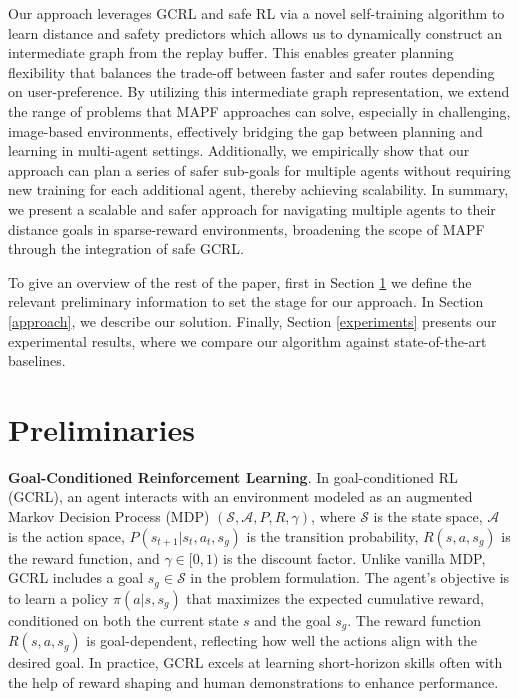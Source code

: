 \documentclass[letterpaper, 10 pt, conference]{IEEEConference}
\begin{document}
Our approach leverages GCRL and safe RL via a novel self-training algorithm to learn distance and safety predictors which allows us to dynamically construct an intermediate graph from the replay buffer. This enables greater planning flexibility that balances the trade-off between faster and safer routes depending on user-preference. By utilizing this intermediate graph representation, we extend the range of problems that MAPF approaches can solve, especially in challenging, image-based environments, effectively bridging the gap between planning and learning in multi-agent settings. Additionally, we empirically show that our approach can plan a series of safer sub-goals for multiple agents without requiring new training for each additional agent, thereby achieving scalability. In summary, we present a scalable and safer approach for navigating multiple agents to their distance goals in sparse-reward environments, broadening the scope of MAPF through the integration of safe GCRL.

To give an overview of the rest of the paper, first in Section \ref{preliminaries} we define the relevant preliminary information to set the stage for our approach. In Section \ref{approach}, we describe our solution.  Finally, Section \ref{experiments} presents our experimental results, where we compare our algorithm against state-of-the-art baselines.  

\section{Preliminaries}
\label{preliminaries}

\textbf{Goal-Conditioned Reinforcement Learning}. In goal-conditioned RL (GCRL), an agent interacts with an environment modeled as an augmented Markov Decision Process (MDP) \((\mathcal{S}, \mathcal{A}, P, R, \gamma)\), where \(\mathcal{S}\) is the state space, \(\mathcal{A}\) is the action space, \(P(s_{t+1}|s_t, a_t, s_g)\) is the transition probability, \(R(s, a, s_g)\) is the reward function, and \(\gamma \in [0, 1)\) is the discount factor. Unlike vanilla MDP, GCRL includes a goal $s_g \in \mathcal{S}$ in the problem formulation. The agent’s objective is to learn a policy \(\pi(a|s, s_g)\) that maximizes the expected cumulative reward, conditioned on both the current state \(s\) and the goal \(s_g\). The reward function \(R(s, a, s_g)\) is goal-dependent, reflecting how well the actions align with the desired goal. In practice, GCRL excels at learning short-horizon skills often with the help of reward shaping \cite{chiang2019learning} and human demonstrations \cite{lynch2019learning,nair2018overcoming} to enhance performance.
\end{document}
